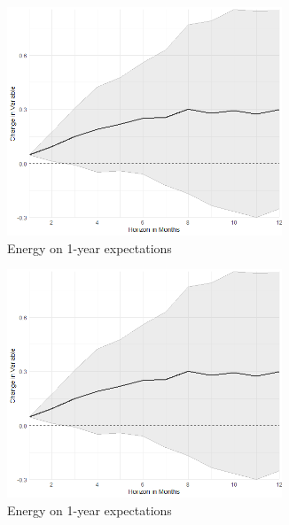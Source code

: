 \begin{figure}
\begin{subfigure}{00.24\textwidth}
		\includegraphics[width=0.9\textwidth]{output/lp/baseline/level/energy/energyonexpectations1y_djn.png}
		\caption{Energy on 1-year expectations}
	\end{subfigure}
	\begin{subfigure}{00.24\textwidth}
		\includegraphics[width=0.9\textwidth]{output/lp/baseline/level/energy/energyonexpectations1y_djn.png}
		\caption{Energy on 1-year expectations}
	\end{subfigure}
	\begin{subfigure}{00.24\textwidth}

\end{subfigure}
\end{figure}
